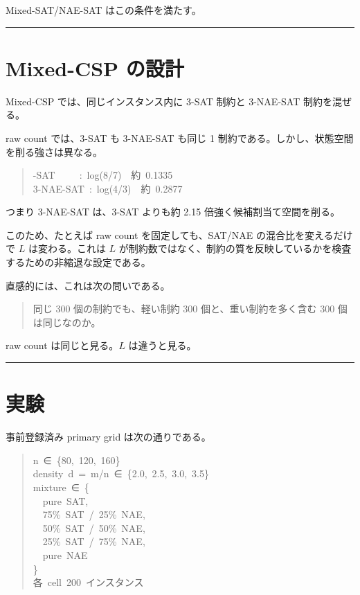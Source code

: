 \documentclass[12pt,a4paper]{article}
\begin{document}
Mixed-SAT/NAE-SAT はこの条件を満たす。

\begin{center}\rule{0.5\linewidth}{0.5pt}\end{center}

\section{Mixed-CSP の設計}\label{mixed-csp-ux306eux8a2dux8a08}

Mixed-CSP では、同じインスタンス内に 3-SAT 制約と 3-NAE-SAT 制約を混ぜる。

raw count では、3-SAT も 3-NAE-SAT も同じ 1 制約である。しかし、状態空間を削る強さは異なる。

\begin{quote}
{\small\ttfamily{}-SAT~~~~~:~log(8/7)~~約~0.1335 \\3-NAE-SAT~:~log(4/3)~~約~0.2877
}
\end{quote}

つまり 3-NAE-SAT は、3-SAT よりも約 2.15 倍強く候補割当て空間を削る。

このため、たとえば raw count を固定しても、SAT/NAE の混合比を変えるだけで $L$ は変わる。これは $L$ が制約数ではなく、制約の質を反映しているかを検査するための非縮退な設定である。

直感的には、これは次の問いである。

\begin{quote}
同じ 300 個の制約でも、軽い制約 300 個と、重い制約を多く含む 300 個は同じなのか。
\end{quote}

raw count は同じと見る。$L$ は違うと見る。

\begin{center}\rule{0.5\linewidth}{0.5pt}\end{center}

\section{実験}\label{ux5b9fux9a13}

事前登録済み primary grid は次の通りである。

\begin{quote}
{\small\ttfamily\noindent
n~∈~\{80,~120,~160\} \\density~d~=~m/n~∈~\{2.0,~2.5,~3.0,~3.5\} \\mixture~∈~\{ \\~~pure~SAT, \\~~75\%~SAT~/~25\%~NAE, \\~~50\%~SAT~/~50\%~NAE, \\~~25\%~SAT~/~75\%~NAE, \\~~pure~NAE \\\} \\各~cell~200~インスタンス
}
\end{quote}
\end{document}
